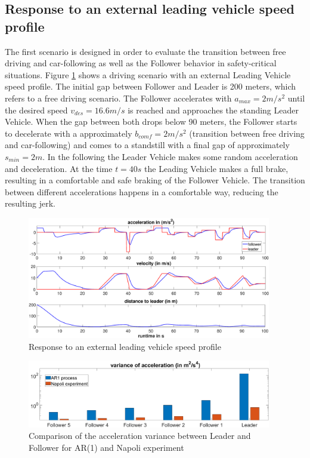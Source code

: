 \documentclass[review]{elsarticle}
\begin{document}
\subsection{Response to an external leading vehicle speed profile}
The first scenario is designed in order to evaluate the transition between free driving and car-following as well as the Follower behavior in safety-critical situations. 
Figure \ref{fig:manipulatedLeader} shows a driving scenario with an external Leading Vehicle speed profile. The initial gap between Follower and Leader is 200 meters, which refers to a free driving scenario. The Follower accelerates with $a_{max} = 2m/s^2$ until the desired speed $v_{des} = 16.6m/s$ is reached and approaches the standing Leader Vehicle. When the gap between both drops below 90 meters, the Follower starts to decelerate with a approximately $b_{comf} = 2m/s^2$ (transition between free driving and car-following) and comes to a standstill with a final gap of approximately $s_{min} = 2m$. In the following the Leader Vehicle makes some random acceleration and deceleration. At the time $t = 40s$ the Leading Vehicle makes a full brake, resulting in a comfortable and safe braking of the Follower Vehicle. The transition between different accelerations happens in a comfortable way, reducing the resulting jerk. 



\begin{figure}
	\centering
	\includegraphics[width=0.95\textwidth]{images/manipulatedLeader.eps}
	\caption{Response to an external leading vehicle speed profile}
	\label{fig:manipulatedLeader}
\end{figure}

\begin{figure}
	\centering
	\includegraphics[width=0.95\textwidth]{images/VarAccComp}
	\caption{Comparison of the acceleration variance between Leader and Follower for AR(1) and Napoli experiment}
	\label{fig:VarAccComp}
\end{figure}
\end{document}
